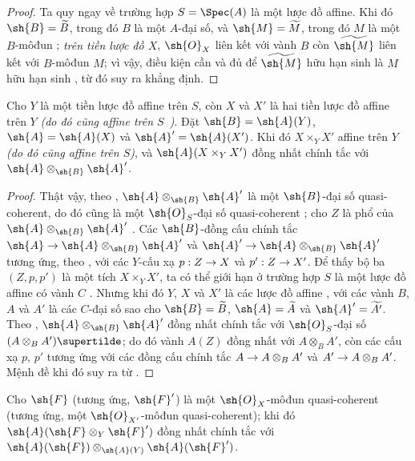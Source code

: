 \documentclass[oneside,10pt]{amsart}
\makeatletter
\newcommand{\ega@arrow}[2]{\mathchoice{#1}{#2}{#2}{#2}}
\renewcommand{\to}{\ega@arrow{\longrightarrow}{\rightarrow}}
\let\EGAOriginalLabel\label
\renewcommand{\label}[1]{\phantomsection\EGAOriginalLabel{#1}}
\makeatother
\begin{document}
\begin{proof}
Ta quy ngay về trường hợp $S=\Spec(A)$ là một lược đồ affine.
Khi đó $\sh{B}=\widetilde{B}$, trong đó $B$ là một $A$-đại số, và $\sh{M}=\widetilde{M}$, trong đó $M$ là một $B$-môđun ; \emph{trên tiền lược đồ $X$}, $\sh{O}_X$ liên kết với vành $B$ còn $\widetilde{\sh{M}}$ liên kết với $B$-môđun $M$; vì vậy, điều kiện cần và đủ để $\widetilde{\sh{M}}$ hữu hạn sinh là $M$ hữu hạn sinh , từ đó suy ra khẳng định.
\end{proof}

\begin{proposition}[1.4.6]
\label{II.1.4.6}
Cho $Y$ là một tiền lược đồ affine trên $S$, còn $X$ và $X'$ là hai tiền lược đồ affine trên $Y$ \emph{(do đó cũng affine trên $S$~)}.
Đặt $\sh{B}=\sh{A}(Y)$, $\sh{A}=\sh{A}(X)$ và $\sh{A}'=\sh{A}(X')$.
Khi đó $X\times_Y X'$ affine trên $Y$ \emph{(do đó cũng affine trên $S$)}, và $\sh{A}(X\times_Y X')$ đồng nhất chính tắc với $\sh{A}\otimes_\sh{B}\sh{A}'$.
\end{proposition}

\begin{proof}
Thật vậy, theo , $\sh{A}\otimes_\sh{B}\sh{A}'$ là một $\sh{B}$-đại số quasi-coherent, do đó cũng là một $\sh{O}_S$-đại số quasi-coherent ; cho $Z$ là phổ của $\sh{A}\otimes_\sh{B}\sh{A}'$ .
Các $\sh{B}$-đồng cấu chính tắc $\sh{A}\to\sh{A}\otimes_\sh{B}\sh{A}'$ và $\sh{A}'\to\sh{A}\otimes_\sh{B}\sh{A}'$ tương ứng, theo , với các $Y$-cấu xạ $p:Z\to X$ và $p':Z\to X'$.
Để thấy bộ ba $(Z,p,p')$ là một tích $X\times_Y X'$, ta có thể giới hạn ở trường hợp $S$ là một lược đồ affine có vành $C$ .
Nhưng khi đó $Y$, $X$ và $X'$ là các lược đồ affine , với các vành $B$, $A$ và $A'$ là các $C$-đại số sao cho $\sh{B}=\widetilde{B}$, $\sh{A}=\widetilde{A}$ và $\sh{A}'=\widetilde{A'}$.
Theo , $\sh{A}\otimes_\sh{B}\sh{A}'$ đồng nhất chính tắc với $\sh{O}_S$-đại số $(A\otimes_B A')\supertilde$; do đó vành $A(Z)$ đồng nhất với $A\otimes_B A'$, còn các cấu xạ $p$, $p'$ tương ứng với các đồng cấu chính tắc $A\to A\otimes_B A'$ và $A'\to A\otimes_B A'$.
Mệnh đề khi đó suy ra từ .
\end{proof}

\begin{corollary}[1.4.7]
\label{II.1.4.7}
Cho $\sh{F}$ (tương ứng, $\sh{F}'$) là một $\sh{O}_X$-môđun quasi-coherent (tương ứng, một $\sh{O}_{X'}$-môđun quasi-coherent); khi đó $\sh{A}(\sh{F}\otimes_Y\sh{F}')$ đồng nhất chính tắc với $\sh{A}(\sh{F})\otimes_{\sh{A}(Y)}\sh{A}(\sh{F}')$.
\end{corollary}
\end{document}
